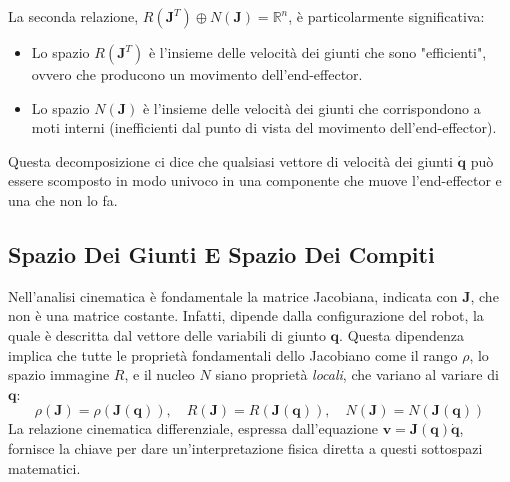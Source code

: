 ﻿\documentclass[11pt, a4paper]{article}
\begin{document}
\begin{itemize}
    La seconda relazione, $R(\bm{J}^T) \oplus N(\bm{J}) = \mathbb{R}^{n}$, è particolarmente significativa:
    \begin{itemize}
        \item Lo spazio \(R(\bm{J}^T)\) è l'insieme delle velocità dei giunti che sono "efficienti", ovvero che producono un movimento dell'end-effector.
        \item Lo spazio \(N(\bm{J})\) è l'insieme delle velocità dei giunti che corrispondono a moti interni (inefficienti dal punto di vista del movimento dell'end-effector).
    \end{itemize}
    Questa decomposizione ci dice che qualsiasi vettore di velocità dei giunti \(\dot{\bm{q}}\) può essere scomposto in modo univoco in una componente che muove l'end-effector e una che non lo fa.
\end{itemize}


\newpage
\subsection{Spazio Dei Giunti E Spazio Dei Compiti}
Nell'analisi cinematica è fondamentale la matrice Jacobiana, indicata con $\bm{J}$, che non è una matrice costante. Infatti, dipende dalla configurazione del robot, la quale è descritta dal vettore delle variabili di giunto $\bm{q}$. Questa dipendenza implica che tutte le proprietà fondamentali dello Jacobiano come il rango $\rho$, lo spazio immagine $R$, e il nucleo $N$ siano proprietà \textit{locali}, che variano al variare di $\bm{q}$:
\[
    \rho(\bm{J}) = \rho(\bm{J}(\bm{q})), \quad R(\bm{J}) = R(\bm{J}(\bm{q})), \quad N(\bm{J}) = N(\bm{J}(\bm{q}))
\]
La relazione cinematica differenziale, espressa dall'equazione $\bm{v} = \bm{J}(\bm{q})\dot{\bm{q}}$, fornisce la chiave per dare un'interpretazione fisica diretta a questi sottospazi matematici.

\begin{center}
\end{center}
\end{document}
